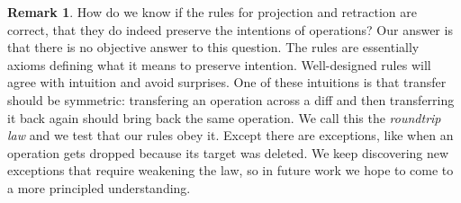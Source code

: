 \documentclass[english,submission]{programming}
\theoremstyle{definition}
\newtheorem*{remark}{Remark}
\newcommand{\mathbox}[1]{\colorbox{black!10}{$#1$}}
\begin{document}
\begin{remark}
How do we know if the rules for projection and retraction are correct, that they do indeed preserve the intentions of operations? Our answer is that there is no objective answer to this question. The rules are essentially axioms defining what it means to preserve intention. Well-designed rules will agree with intuition and avoid surprises. One of these intuitions is that transfer should be symmetric: transfering an operation across a diff and then transferring it back again should bring back the same operation. We call this the \textit{roundtrip law} and we test that our rules obey it. Except there are exceptions, like when an operation gets dropped because its target was deleted. We keep discovering new exceptions that require weakening the law, so in future work we hope to come to a more principled understanding.



\end{remark}
\end{document}
